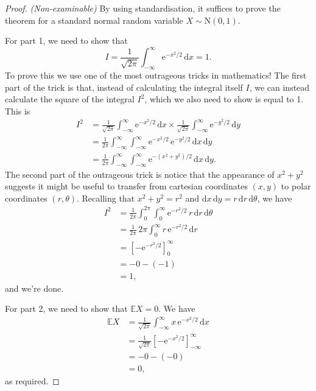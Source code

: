 \documentclass[
  a4paper,
]{book}
\theoremstyle{definition}
\theoremstyle{definition}
\theoremstyle{definition}
\theoremstyle{definition}
\theoremstyle{remark}
\begin{document}
\begin{proof}
\emph{(Non-examinable)} By using standardisation, it suffices to prove the theorem for a standard normal random variable \(X \sim \mathrm{N}(0,1)\).

For part 1, we need to show that
\[ I = \frac{1}{\sqrt{2\pi}} \int_{-\infty}^\infty \mathrm e^{-x^2/2}\, \mathrm dx = 1 . \]
To prove this we use one of the most outrageous tricks in mathematics! The first part of the trick is that, instead of calculating the integral itself \(I\), we can instead calculate the square of the integral \(I^2\), which we also need to show is equal to 1. This is
\begin{align*}
  I^2 &= \frac{1}{\sqrt{2\pi}} \int_{-\infty}^\infty \mathrm e^{-x^2/2}\, \mathrm dx \times \frac{1}{\sqrt{2\pi}} \int_{-\infty}^\infty \mathrm e^{-y^2/2}\, \mathrm dy\\
    &= \frac{1}{2\pi} \int_{-\infty}^\infty \int_{-\infty}^\infty  \mathrm e^{-x^2/2}\,\mathrm e^{-y^2/2} \, \mathrm dx\, \mathrm dy \\
    &= \frac{1}{2\pi} \int_{-\infty}^\infty \int_{-\infty}^\infty  \mathrm e^{-(x^2+y^2)/2}\,\mathrm dx\, \mathrm dy .
\end{align*}
The second part of the outrageous trick is notice that the appearance of \(x^2 + y^2\) suggests it might be useful to transfer from cartesian coordinates \((x,y)\) to polar coordinates \((r, \theta)\). Recalling that \(x^2 + y^2 = r^2\) and \(\mathrm dx\, \mathrm dy = r\, \mathrm dr \,\mathrm d\theta\), we have
\begin{align*}
  I^2 &= \frac{1}{2\pi} \int_{0}^{2\pi} \int_{0}^\infty  \mathrm e^{-r^2/2}\,r\,\mathrm dr\, \mathrm d\theta \\
    &= \frac{1}{2\pi} \, 2\pi\int_{0}^\infty  r\, \mathrm e^{-r^2/2}\,\mathrm dr \\
    &= \left[ -\mathrm e^{-r^2/2} \right]_0^\infty \\
    &= - 0 -(-1) \\
    &= 1 ,
\end{align*}
and we're done.

For part 2, we need to show that \(\mathbb EX = 0\). We have
\begin{align*}
\mathbb EX &= \frac{1}{\sqrt{2\pi}} \int_{-\infty}^{\infty} x\,  \mathrm e^{-x^2/2}\, \mathrm dx \\
  &= \frac{1}{\sqrt{2\pi}} \left[-\mathrm e^{-x^2/2}\right]_{-\infty}^\infty \\
  &= -0 - (-0) \\
  &= 0 ,
\end{align*}
as required.


\end{proof}
\end{document}
